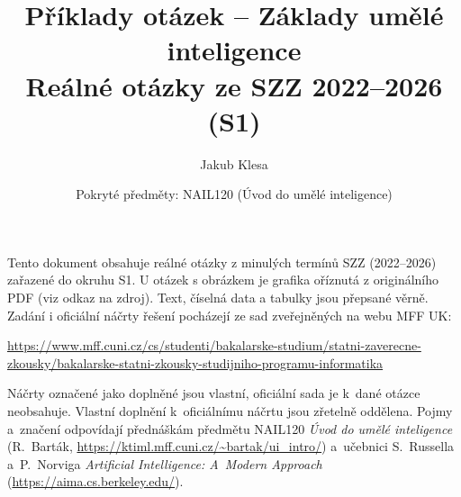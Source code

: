 \documentclass[11pt,a4paper]{article}
\title{Příklady otázek -- Základy umělé inteligence\\[0.3em]\large Reálné otázky ze SZZ 2022--2026 (S1)}
\author{Jakub Klesa}
\date{Pokryté předměty: NAIL120 (Úvod do umělé inteligence)}
\begin{document}
\sloppy
\maketitle
\tableofcontents
\bigskip

\begin{poznamka}
Tento dokument obsahuje reálné otázky z minulých termínů SZZ (2022--2026) zařazené do
okruhu S1. U otázek s obrázkem je grafika oříznutá z originálního PDF (viz odkaz na
zdroj). Text, číselná data a tabulky jsou přepsané věrně.
Zadání i oficiální náčrty řešení pocházejí ze sad zveřejněných na webu MFF UK:\par
{\raggedright\url{https://www.mff.cuni.cz/cs/studenti/bakalarske-studium/statni-zaverecne-zkousky/bakalarske-statni-zkousky-studijniho-programu-informatika}\par}
Náčrty označené jako doplněné jsou vlastní, oficiální sada je k~dané otázce neobsahuje.
Vlastní doplnění k~oficiálnímu náčrtu jsou zřetelně oddělena.
Pojmy a~značení odpovídají přednáškám předmětu NAIL120 \emph{Úvod do umělé inteligence}
(R.~Barták, \url{https://ktiml.mff.cuni.cz/~bartak/ui_intro/}) a~učebnici S.~Russella
a~P.~Norviga \emph{Artificial Intelligence: A~Modern Approach} (\url{https://aima.cs.berkeley.edu/}).
\end{poznamka}
\bigskip














\end{document}

